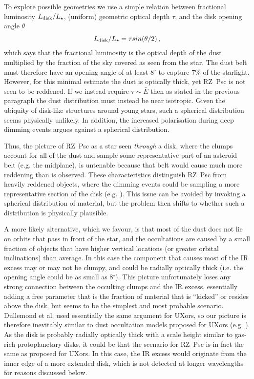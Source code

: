 \documentclass[]{rsos}
\begin{document}
To explore possible geometries we use a simple relation between fractional luminosity
$L_{\rm disk}/L_\star$, (uniform) geometric optical depth $\tau$, and the disk opening
angle $\theta$ \cite{2014MNRAS.438.3299K}
\begin{equation}
  L_{\rm disk}/L_\star = \tau sin(\theta/2) \, ,
\end{equation}
which says that the fractional luminosity is the optical depth of the dust multiplied by
the fraction of the sky covered as seen from the star. The dust belt must therefore have
an opening angle of at least 8$^\circ$ to capture 7\% of the starlight. However, for this
minimal estimate the dust is optically thick, yet RZ~Psc is not seen to be reddened. If
we instead require $\tau \sim \bar{E}$ then as stated in the previous paragraph the dust
distribution must instead be near isotropic. Given the ubiquity of disk-like structures
around young stars, such a spherical distribution seems physically unlikely. In addition,
the increased polarisation during deep dimming events argues against a spherical
distribution.

Thus, the picture of RZ~Psc as a star seen \emph{through} a disk, where the clumps
account for all of the dust and sample some representative part of an asteroid belt
(e.g. the midplane), is untenable because that belt would cause much more reddening than
is observed. These characteristics distinguish RZ~Psc from heavily reddened objects,
where the dimming events could be sampling a more representative section of the disk
(e.g. \cite{2015MNRAS.451...26S}). This issue can be avoided by invoking a spherical
distribution of material, but the problem then shifts to whether such a distribution is
physically plausible.

A more likely alternative, which we favour, is that most of the dust does not lie on
orbits that pass in front of the star, and the occultations are caused by a small
fraction of objects that have higher vertical locations (or greater orbital inclinations)
than average. In this case the component that causes most of the IR excess may or may not
be clumpy, and could be radially optically thick (i.e. the opening angle could be as
small as 8$^\circ$). This picture unfortunately loses any strong connection between the
occulting clumps and the IR excess, essentially adding a free parameter that is the
fraction of material that is ``kicked'' or resides above the disk, but seems to be the
simplest and most probable scenario. Dullemond et al. \cite{2003ApJ...594L..47D} used
essentially the same argument for UXors, so our picture is therefore inevitably similar
to dust occultation models proposed for UXors
(e.g. \cite{1997ApJ...491..885N,2000A&A...364..633N,2003ApJ...594L..47D}).  As the disk
is probably radially optically thick with a scale height similar to gas-rich
protoplanetary disks, it could be that the scenario for RZ~Psc is in fact the same as
proposed for UXors. In this case, the IR excess would originate from the inner edge of a
more extended disk, which is not detected at longer wavelengths for reasons discussed
below.
\end{document}
